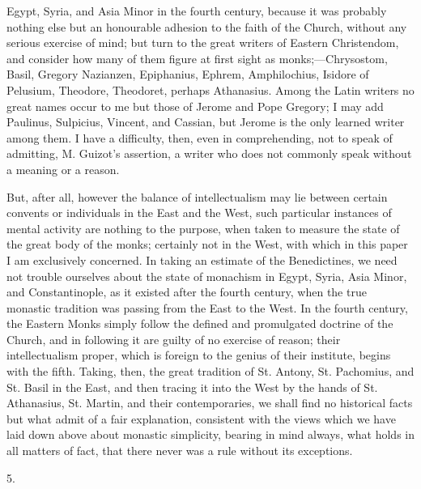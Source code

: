 Egypt, Syria, and Asia Minor in the fourth century, because it was
probably nothing else but an honourable adhesion to the faith of the
Church, without any serious exercise of mind; but turn to the great
writers of Eastern Christendom, and consider how many of them figure
at first sight as monks;—Chrysostom, Basil, Gregory Nazianzen,
Epiphanius, Ephrem, Amphilochius, Isidore of Pelusium, Theodore,
Theodoret, perhaps Athanasius. Among the Latin writers no great names
occur to me but those of Jerome and Pope Gregory; I may add Paulinus,
Sulpicius, Vincent, and Cassian, but Jerome is the only learned writer
among them. I have a difficulty, then, even in comprehending, not to
speak of admitting, M. Guizot's assertion, a writer who does not
commonly speak without a meaning or a reason.

But, after all, however the balance of intellectualism may lie
between certain convents or individuals in the East and the West, such
particular instances of mental activity are nothing to the purpose,
when taken to measure the state of the great body of the monks;
certainly not in the West, with which in this paper I am exclusively
concerned. In taking an estimate of the Benedictines, we need not
trouble ourselves about the state of monachism in Egypt, Syria, Asia
Minor, and Constantinople, as it existed after the fourth century,
when the true monastic tradition was passing from the East to the
West. In the fourth century, the Eastern Monks simply follow the
defined and promulgated doctrine of the Church, and in following it
are guilty of no exercise of reason; their intellectualism proper,
which is foreign to the genius of their institute, begins with the
fifth. Taking, then, the great tradition of St. Antony, St. Pachomius,
and St. Basil in the East, and then tracing it into the West by
the hands of St. Athanasius, St. Martin, and their contemporaries, we
shall find no historical facts but what admit of a fair explanation,
consistent with the views which we have laid down above about monastic
simplicity, bearing in mind always, what holds in all matters of fact,
that there never was a rule without its exceptions.

5.

